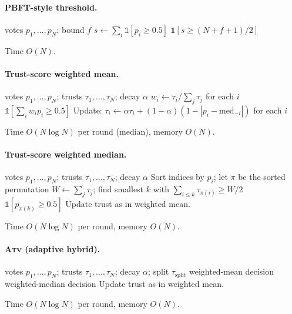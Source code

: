 \documentclass[11pt]{article}
\begin{document}
\paragraph{PBFT-style threshold.}
\begin{algorithmic}[1]
\Require votes $p_1, \ldots, p_N$; bound $f$
\State $s \gets \sum_i \mathbb{1}[p_i \geq 0.5]$
\State \Return $\mathbb{1}[s \geq (N+f+1)/2]$
\end{algorithmic}
Time $O(N)$.

\paragraph{Trust-score weighted mean.}
\begin{algorithmic}[1]
\Require votes $p_1, \ldots, p_N$; trusts $\tau_1, \ldots, \tau_N$; decay $\alpha$
\State $w_i \gets \tau_i / \sum_j \tau_j$ for each $i$
\State \Return $\mathbb{1}[\sum_i w_i p_i \geq 0.5]$
\State Update: $\tau_i \gets \alpha \tau_i + (1-\alpha)(1 - |p_i - \text{med}_{-i}|)$ for each $i$
\end{algorithmic}
Time $O(N \log N)$ per round (median), memory $O(N)$.

\paragraph{Trust-score weighted median.}
\begin{algorithmic}[1]
\Require votes $p_1, \ldots, p_N$; trusts $\tau_1, \ldots, \tau_N$; decay $\alpha$
\State Sort indices by $p_i$; let $\pi$ be the sorted permutation
\State $W \gets \sum_j \tau_j$; find smallest $k$ with $\sum_{i \leq k} \tau_{\pi(i)} \geq W/2$
\State \Return $\mathbb{1}[p_{\pi(k)} \geq 0.5]$
\State Update trust as in weighted mean.
\end{algorithmic}
Time $O(N \log N)$ per round, memory $O(N)$.

\paragraph{\textsc{Atv} (adaptive hybrid).}
\begin{algorithmic}[1]
\Require votes $p_1, \ldots, p_N$; trusts $\tau_1, \ldots, \tau_N$; decay $\alpha$; split $\tau_{\text{split}}$
  \State \Return weighted-mean decision
\Else
  \State \Return weighted-median decision
\EndIf
\State Update trust as in weighted mean.
\end{algorithmic}
Time $O(N \log N)$ per round, memory $O(N)$.
\end{document}
